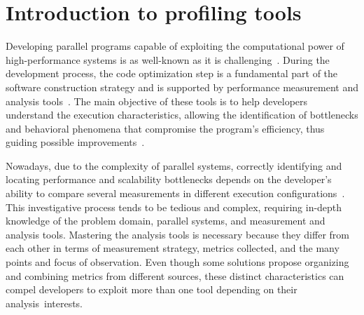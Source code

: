 \section{Introduction to profiling tools} \label{sec:introduction_to_profiling_tools}

Developing parallel programs capable of exploiting the computational power of high-performance systems is as well-known as it is challenging~\cite{Huck2007, Islam2019, Weber2019}. 
During the development process, the code optimization step is a fundamental part of the software construction strategy and is supported by performance measurement and analysis tools~\cite{Bergel2019, Weber2019, Huck2005, Geimer2010, Shende2006, Adhianto2010, Miller1995, Galobardes2015, Pillet2007, Islam2019}. The main objective of these tools is to help developers understand the execution characteristics, allowing the identification of bottlenecks and behavioral phenomena that compromise the program’s efficiency, thus guiding possible improvements~\cite{Brink2020, Huck2007}.

Nowadays, due to the complexity of parallel systems, correctly identifying and locating performance and scalability bottlenecks depends on the developer's ability to compare several measurements in different execution configurations~\cite{Bergel2019, Silva2018}. This investigative process tends to be tedious and complex, requiring in-depth knowledge of the problem domain, parallel systems, and measurement and analysis tools. 
Mastering the analysis tools is necessary because they differ from each other in terms of measurement strategy, metrics collected, and the many points and focus of observation.
Even though some solutions propose organizing and combining metrics from different sources, these distinct characteristics can compel developers to exploit more than one tool depending on their analysis~interests.


